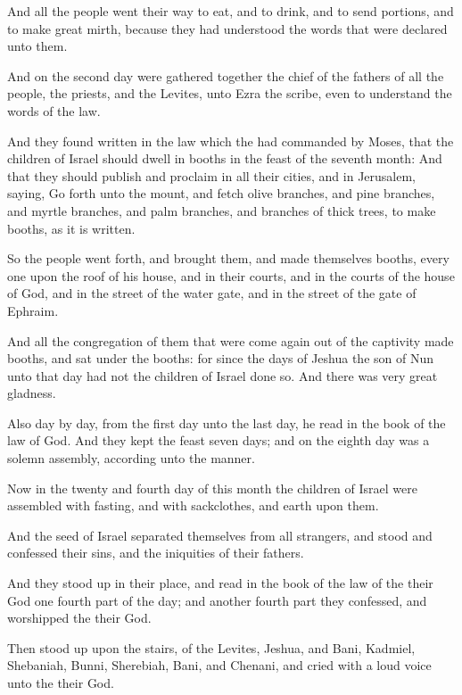 \Verse And all the people went their way to eat, and to drink, and to send portions, and to make great mirth, because they had understood the words that were declared unto them.

\Verse And on the second day were gathered together the chief of the fathers of all the people, the priests, and the Levites, unto Ezra the scribe, even to understand the words of the law.

\Verse And they found written in the law which the \LORD had commanded by Moses, that the children of Israel should dwell in booths in the feast of the seventh month: \Verse And that they should publish and proclaim in all their cities, and in Jerusalem, saying, Go forth unto the mount, and fetch olive branches, and pine branches, and myrtle branches, and palm branches, and branches of thick trees, to make booths, as it is written.

\Verse So the people went forth, and brought them, and made themselves booths, every one upon the roof of his house, and in their courts, and in the courts of the house of God, and in the street of the water gate, and in the street of the gate of Ephraim.

\Verse And all the congregation of them that were come again out of the captivity made booths, and sat under the booths: for since the days of Jeshua the son of Nun unto that day had not the children of Israel done so. And there was very great gladness.

\Verse Also day by day, from the first day unto the last day, he read in the book of the law of God. And they kept the feast seven days; and on the eighth day was a solemn assembly, according unto the manner.


\Chapter
\Verse Now in the twenty and fourth day of this month the children of Israel were assembled with fasting, and with sackclothes, and earth upon them.

\Verse And the seed of Israel separated themselves from all strangers, and stood and confessed their sins, and the iniquities of their fathers.

\Verse And they stood up in their place, and read in the book of the law of the \LORD their God one fourth part of the day; and another fourth part they confessed, and worshipped the \LORD their God.

\Verse Then stood up upon the stairs, of the Levites, Jeshua, and Bani, Kadmiel, Shebaniah, Bunni, Sherebiah, Bani, and Chenani, and cried with a loud voice unto the \LORD their God.


